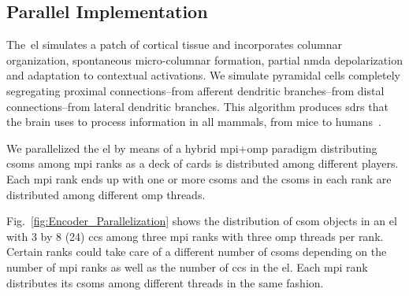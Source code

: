 {\subsection{ Parallel Implementation}
\label{EL_Parallelization}

The~\gls{el} simulates a patch of cortical tissue and incorporates columnar organization, spontaneous micro-columnar formation, partial \gls{nmda} depolarization and adaptation to contextual activations. We simulate pyramidal cells completely segregating proximal connections--from afferent dendritic branches--from distal connections--from lateral dendritic branches. This algorithm produces \glspl{sdr} that the brain uses to process information in all mammals, from mice to humans~\cite{barth_2012}.

We parallelized the \gls{el} by means of a hybrid \gls{mpi}+\gls{omp} paradigm distributing \glspl{csom} among \gls{mpi} ranks as a deck of cards is distributed among different players. Each \gls{mpi} rank ends up with one or more \glspl{csom} and the \glspl{csom} in each rank are distributed among different \gls{omp} threads.%

Fig.~\ref{fig:Encoder_Parallelization} shows the distribution of \gls{csom} objects in an \gls{el} with 3 by 8 (24) \glspl{cc} among three \gls{mpi} ranks with three \gls{omp} threads per rank. Certain ranks could take care of a different number of \glspl{csom} depending on the number of \gls{mpi} ranks as well as the number of \glspl{cc} in the \gls{el}. Each \gls{mpi} rank distributes its \glspl{csom} among different threads in the same fashion.

}
